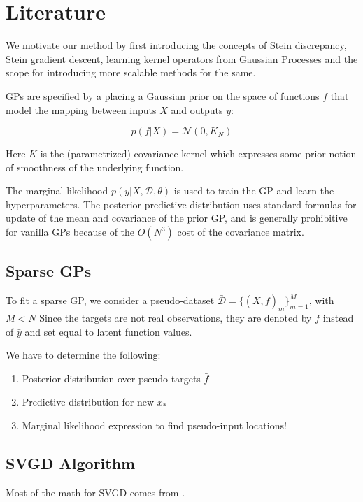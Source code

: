 \documentclass[12pt]{article}
\renewcommand{\[}{\left[}
\renewcommand{\]}{\right]}
\renewcommand{\(}{\left(}
\renewcommand{\)}{\right)}
\begin{document}
\section{Literature}
We motivate our method by first introducing the concepts of Stein discrepancy, Stein gradient descent, learning kernel operators from Gaussian Processes and the scope for introducing more scalable methods for the same. 

GPs are specified by a placing a Gaussian prior on the space of functions $f$ that model the mapping between inputs $X$ and outputs $y$:

$$p(f | X) = \mathcal{N}(0, K_N)$$

Here $K$ is the (parametrized) covariance kernel which expresses some prior notion of smoothness of the underlying function.

The marginal likelihood $p(y | X, \mathcal{D}, \theta)$ is used to train the GP and learn the hyperparameters. The posterior predictive distribution uses standard formulas for update of the mean and covariance of the prior GP, and is generally prohibitive for vanilla GPs because of the $O(N^3)$ cost of the covariance matrix.

\subsection{Sparse GPs}

\citep{snelson_sparse_2005} To fit a sparse GP, we consider a pseudo-dataset $\bar{\mathcal{D}} = \{(\bar{X}, \bar{f})_m\}_{m=1}^{M}$, with $M<N$ Since the targets are not real observations, they are denoted by $\bar{f}$ instead of $\bar{y}$ and set equal to latent function values.

We have to determine the following:

\begin{enumerate}
    \item Posterior distribution over pseudo-targets $\bar{f}$

    \item Predictive distribution for new $x_{\ast}$

    \item Marginal likelihood expression to find pseudo-input locations!
\end{enumerate}

\subsection{SVGD Algorithm}
Most of the math for SVGD comes from \cite{liu_short_2016,liu_kernelized_2016}.
\end{document}
